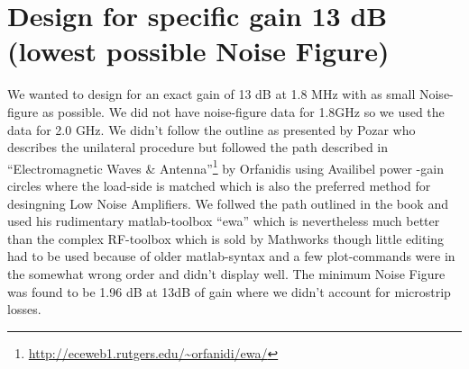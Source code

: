 \documentclass{article}
\begin{document}
\section{Design for specific gain 13 dB (lowest possible Noise Figure)}
We wanted to design for an exact gain of 13 dB at 1.8 MHz with as small Noise-figure as possible.
We did not have noise-figure data for 1.8GHz so we used the data for 2.0 GHz.
We didn't follow the outline as presented by Pozar who describes the unilateral procedure
but followed the path described in
``Electromagnetic Waves \& Antenna''\footnote{\url{http://eceweb1.rutgers.edu/~orfanidi/ewa/}}
by Orfanidis using Availibel power -gain circles where
the load-side is matched which is also the preferred method
for desingning Low Noise Amplifiers.
We follwed the path outlined in the book and used his rudimentary matlab-toolbox ``ewa''
which is nevertheless much better than the complex RF-toolbox which is sold by Mathworks
though little editing had to be used because of older matlab-syntax and a
few plot-commands were in the somewhat wrong order and didn't display well.
 The minimum Noise Figure was found to be 1.96 dB at 13dB of gain
where we didn't account for microstrip losses.
\end{document}
